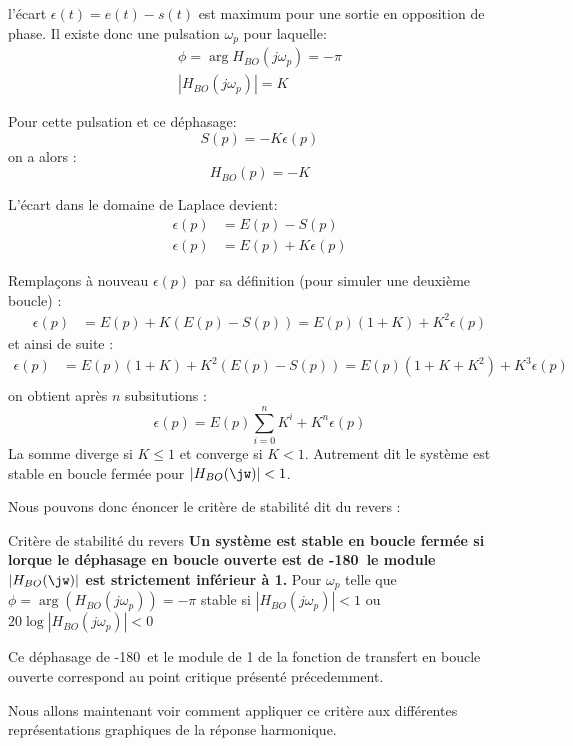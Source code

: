 l'écart $\epsilon(t)=e(t)-s(t)$ est maximum pour une sortie en opposition de phase.
Il existe donc une pulsation $\omega_p$ pour laquelle:
\begin{align*}
    \phi=\arg{H_{BO}(j\omega_p)}=-\pi\\
    |H_{BO}(j\omega_p)|=K    
\end{align*}

Pour cette pulsation et ce déphasage: 
$$
S(p)=-K\epsilon(p)
$$
on a alors :
$$
H_{BO}(p)=-K
$$

L'écart dans le domaine de Laplace devient:
\begin{align*}
    \epsilon(p)&=E(p)-S(p)\\
    \epsilon(p)&=E(p)+K\epsilon(p)
\end{align*}

Remplaçons à nouveau $\epsilon(p)$ par sa définition (pour simuler une deuxième boucle) : 
\begin{align*}
    \epsilon(p)&=E(p)+K(E(p)-S(p))=E(p)(1+K)+K^2\epsilon(p)
\end{align*}
et ainsi de suite :
\begin{align*}
    \epsilon(p)&=E(p)(1+K)+K^2\left(E(p)-S(p)\right)=E(p)(1+K+K^2)+K^3\epsilon(p)\\
\end{align*}
on obtient après $n$ subsitutions :
$$
\epsilon(p)=E(p)\sum_{i=0}^{n}K^i+K^n\epsilon(p)
$$
La somme diverge si $K\leq1$ et converge si $K<1$. Autrement dit le système est stable 
en boucle fermée pour $|H_{BO}(\jw)|<1$.

Nous pouvons donc énoncer le critère de stabilité dit du revers :

\begin{criteria}{Critère de stabilité du revers}
    \textbf{Un système est stable en boucle fermée si lorque le déphasage en boucle 
    ouverte est de -180\degree~le module $|H_{BO}(\jw)|$ est strictement inférieur à 1.}
    Pour $\omega_p$ telle que $\phi=\arg{\left(H_{BO}(j\omega_p)\right)}=-\pi$ stable 
    si  $|H_{BO}(j\omega_p)|<1$ ou $20\log{|H_{BO}(j\omega_p)|}<0$ 
\end{criteria}

Ce déphasage de -180\degree~et le module de 1 de la fonction de transfert en boucle ouverte
correspond au point critique présenté précedemment.

Nous allons maintenant voir comment appliquer ce critère aux différentes représentations graphiques
de la réponse harmonique.

\newpage

